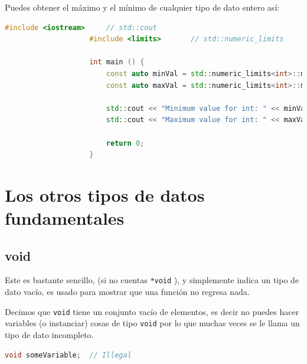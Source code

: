 \documentclass[12pt, fleqn]{report}                             %
\theoremstyle{break}                                            %
\newcommand{\textCode}[1]  { \texttt{#1} }                      %
\begin{document}
                Puedes obtener el máximo y el mínimo de cualquier tipo de dato entero así:
                \begin{lstlisting}[language=C++, gobble=20]
                    #include <iostream>     // std::cout
                    #include <limits>       // std::numeric_limits

                    int main () {
                        const auto minVal = std::numeric_limits<int>::min();
                        const auto maxVal = std::numeric_limits<int>::max();
                        
                        std::cout << "Minimum value for int: " << minVal << '\n';
                        std::cout << "Maximum value for int: " << maxVal << '\n';
                        
                        return 0;
                    }
                \end{lstlisting}
            

            
        \clearpage
        \section{Los otros tipos de datos fundamentales}

            \subsection{void}

                Este es bastante sencillo, (si no cuentas \textCode{*void}), y simplemente indica
                un tipo de dato vacío, es usado para mostrar que una función no regresa nada.
               
                Decimos que \textCode{void} tiene un conjunto vacío de elementos, es decir no puedes hacer
                variables (o instanciar) cosas de tipo  \textCode{void} por lo que muchas veces
                se le llama un tipo de dato incompleto.
                \begin{lstlisting}[language=C++, gobble=20]
                    void someVariable;  // Illegal
                \end{lstlisting}
\end{document}
